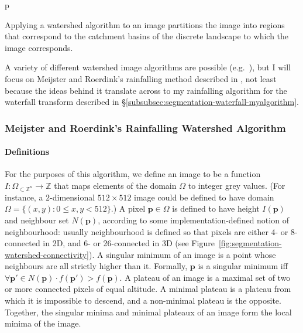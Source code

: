 \begin{stusubfig}{p}
\caption{Applying a watershed algorithm to an image partitions the image into regions that correspond to the catchment basins of the discrete landscape to which the image corresponds.}
\label{fig:segmentation-watershed-regionbasincorrespondence}
\end{stusubfig}

A variety of different watershed image algorithms are possible (e.g.~\cite{bieniek00,meijster98,osma-ruiz06,rambabu07,stoev00}), but I will focus on Meijster and Roerdink's rainfalling method described in \cite{meijster98}, not least because the ideas behind it translate across to my rainfalling algorithm for the waterfall transform described in \S\ref{subsubsec:segmentation-waterfall-myalgorithm}.

\subsubsection{Meijster and Roerdink's Rainfalling Watershed Algorithm}

\paragraph{Definitions}

For the purposes of this algorithm, we define an image to be a function $I: \Omega_{\subset \mathbb{Z}^n} \to \mathbb{Z}$ that maps elements of the domain $\Omega$ to integer grey values. (For instance, a $2$-dimensional $512 \times 512$ image could be defined to have domain $\Omega = \{(x,y) : 0 \le x,y < 512\}$.) A pixel $\mathbf{p} \in \Omega$ is defined to have height $I(\mathbf{p})$ and neighbour set $N(\mathbf{p})$, according to some implementation-defined notion of neighbourhood: usually neighbourhood is defined so that pixels are either 4- or 8-connected in 2D, and 6- or 26-connected in 3D (see Figure~\ref{fig:segmentation-watershed-connectivity}). A singular minimum of an image is a point whose neighbours are all strictly higher than it. Formally, $\mathbf{p}$ is a singular minimum iff $\forall \mathbf{p'} \in N(\mathbf{p}) \cdot f(\mathbf{p'}) > f(\mathbf{p})$. A plateau of an image is a maximal set of two or more connected pixels of equal altitude. A minimal plateau is a plateau from which it is impossible to descend, and a non-minimal plateau is the opposite. Together, the singular minima and minimal plateaux of an image form the local minima of the image.

